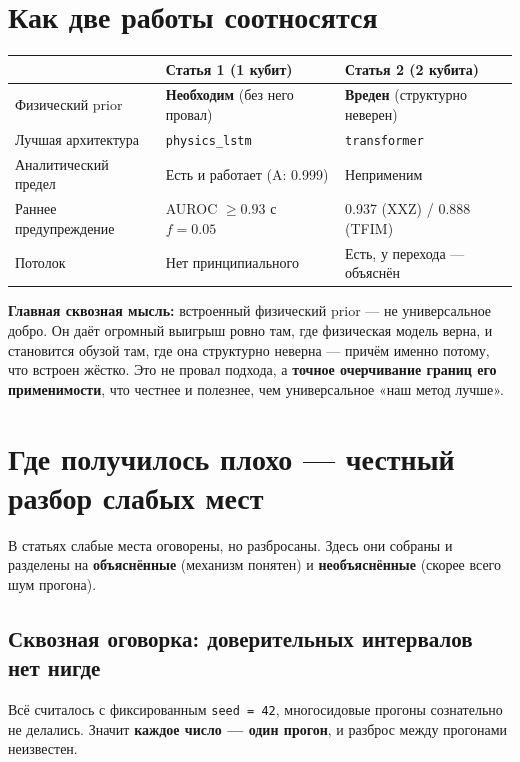 \documentclass[12pt,a4paper]{article}
\newcommand{\code}[1]{\texttt{#1}}
\begin{document}
\section{Как две работы соотносятся}

\begin{center}
\begin{tabular}{@{}p{4.2cm}p{4.6cm}p{4.6cm}@{}}
\toprule
 & Статья 1 (1 кубит) & Статья 2 (2 кубита) \\
\midrule
Физический prior & \textbf{Необходим} (без него провал) & \textbf{Вреден}
  (структурно неверен) \\
Лучшая архитектура & \code{physics\_lstm} & \code{transformer} \\
Аналитический предел & Есть и работает (A: 0.999) & Неприменим \\
Раннее предупреждение & AUROC $\geq 0.93$ с $f=0.05$ & 0.937 (XXZ) / 0.888 (TFIM) \\
Потолок & Нет принципиального & Есть, у перехода — объяснён \\
\bottomrule
\end{tabular}
\end{center}

\textbf{Главная сквозная мысль:} встроенный физический prior — не универсальное
добро. Он даёт огромный выигрыш ровно там, где физическая модель верна, и
становится обузой там, где она структурно неверна — причём именно потому, что
встроен жёстко. Это не провал подхода, а \textbf{точное очерчивание границ его
применимости}, что честнее и полезнее, чем универсальное «наш метод лучше».

\section{Где получилось плохо — честный разбор слабых мест}
\label{sec:bad}

В статьях слабые места оговорены, но разбросаны. Здесь они собраны и разделены
на \textbf{объяснённые} (механизм понятен) и \textbf{необъяснённые} (скорее
всего шум прогона).

\subsection{Сквозная оговорка: доверительных интервалов нет нигде}

Всё считалось с фиксированным \code{seed = 42}, многосидовые прогоны сознательно
не делались. Значит \textbf{каждое число — один прогон}, и разброс между
прогонами неизвестен.
\end{document}
